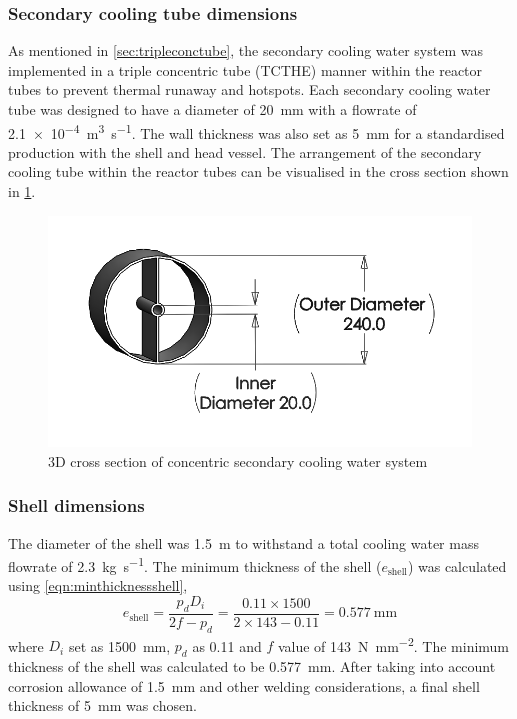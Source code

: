 \subsubsection{Secondary cooling tube dimensions}
As mentioned in \cref{sec:tripleconctube}, the secondary cooling water system was implemented in a triple concentric tube (TCTHE) manner within the reactor tubes to prevent thermal runaway and hotspots. Each secondary cooling water tube was designed to have a diameter of \SI{20}{\milli \metre} with a flowrate of \SI{2.1e-4}{\cubic\m\per\s}. The wall thickness was also set as \SI{5}{\milli \metre} for a standardised production with the shell and head vessel. 
The arrangement of the secondary cooling tube within the reactor tubes can be visualised in the cross section shown in \cref{fig:concentriccoolingwater}. 
\begin{figure}[H]
    \centering
    \includegraphics[width=0.65\linewidth]{chapters/2-reaction/figures/FYD conc tube with calc bw.png} 
    \caption{3D cross section of concentric secondary cooling water system}
    \label{fig:concentriccoolingwater}
\end{figure}

\subsubsection{Shell dimensions}
The diameter of the shell was \SI{1.5}{\metre} to withstand a total cooling water mass flowrate of \SI{2.3}{\kilogram \per \second}.
The minimum thickness of the shell ($e_\mathrm{shell}$) was calculated using \cref{eqn:minthicknessshell},
\begin{equation}
    e_\mathrm{shell} = \frac{p_dD_i}{2f-p_d} = \frac{0.11 \times 1500}{2 \times 143 - 0.11} = \SI{0.577}{\mm}
    \label{eqn:minthicknessshell}
\end{equation}
where $D_i$ set as \SI{1500}{\milli \metre}, $p_d$ as 0.11 and $f$ value of \SI{143}{\N\per\square\mm}. The minimum thickness of the shell was calculated to be \SI{0.577}{\milli \metre}. After taking into account corrosion allowance of \SI{1.5}{\milli \metre} and other welding considerations, a final shell thickness of \SI{5}{\milli \metre} was chosen. 

